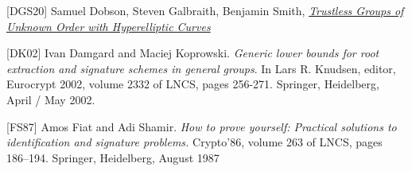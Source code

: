 \documentclass[11pt, lettersize, notitlepage, leqno, footskip=0.6cm]{article}
\newcommand{\noin}{\noindent}
\numberwithin{equation}{section}
\begin{document}
\noin \hypertarget{DGS20}{[DGS20]} Samuel Dobson, Steven Galbraith, Benjamin Smith, \href{https://eprint.iacr.org/2020/196}{\textit{Trustless Groups of Unknown Order with Hyperelliptic Curves}} \vspace{0.1cm}

\noin \hypertarget{{DK02}}{[DK02]} Ivan Damgard and Maciej Koprowski. \textit{Generic lower bounds for root extraction and signature schemes in general groups}. In Lars R. Knudsen, editor, Eurocrypt 2002, volume 2332 of LNCS, pages 256-271. Springer, Heidelberg, April / May 2002.\vspace{0.1cm}


\noin \hypertarget{FS87}{[FS87]} Amos Fiat and Adi Shamir. \textit{How to prove yourself: Practical solutions to identification and signature problems.} Crypto’86, volume 263 of LNCS, pages 186–194. Springer, Heidelberg, August 1987\vspace{0.1cm}


\end{document}
